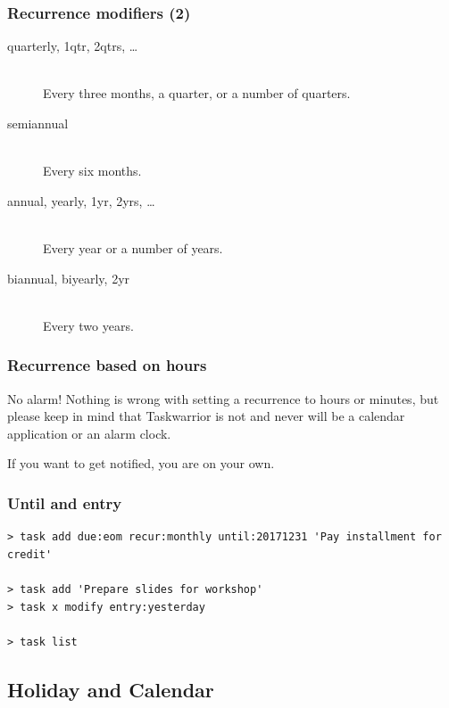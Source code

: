\documentclass[t,handout,aspectratio=169]{beamer}
\begin{document}
\begin{frame}[fragile]\frametitle{Recurrence modifiers (2)}
    \vfill
    \begin{description}
        \item[quarterly, 1qtr, 2qtrs, \ldots] \hfill \\
            Every three months, a quarter, or a number of quarters.
        \item[semiannual] \hfill \\
            Every six months.
        \item[annual, yearly, 1yr, 2yrs, \ldots] \hfill \\
            Every year or a number of years.
        \item[biannual, biyearly, 2yr] \hfill \\
            Every two years.
    \end{description}
\end{frame}

\begin{frame}[fragile]\frametitle{Recurrence based on hours}
    \vfill
    \begin{alertblock}{No alarm!}
        Nothing is wrong with setting a recurrence to hours or minutes, but please keep in mind that Taskwarrior is not and never will be a calendar application or an alarm clock.

        If you want to get notified, you are on your own.
    \end{alertblock}
\end{frame}

\begin{frame}[fragile]\frametitle{Until and entry}
    \vfill
    \begin{lstlisting}
> task add due:eom recur:monthly until:20171231 'Pay installment for credit'

> task add 'Prepare slides for workshop'
> task x modify entry:yesterday

> task list\end{lstlisting}
\end{frame}

\subsection{Holiday and Calendar}
\end{document}
